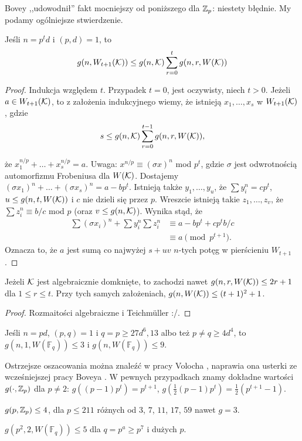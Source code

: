 Bovey ,,udowodnił'' fakt mocniejszy od poniższego dla $\mathbb Z_p$: niestety błędnie.
My podamy ogólniejsze stwierdzenie.

\begin{lemat}
	Jeśli $n = p^td$ i $(p, d) = 1$, to 
	\[
		g(n, W_{t+1}(\mathcal K)) \le g(n, \mathcal K) \sum_{r = 0}^t g(n, r, W(\mathcal K))
	\]
\end{lemat}

\begin{proof}
	Indukcja względem $t$.
	Przypadek $t = 0$, jest oczywisty, niech $t > 0$.
	Jeżeli $a \in W_{t+1}(\mathcal K)$, to z założenia indukcyjnego wiemy, że istnieją $x_1, \ldots, x_s$ w $W_{t+1}(\mathcal K)$, gdzie
	\[
		s \le g(n, \mathcal K) \sum_{r = 0}^{t-1} g(n, r, W(\mathcal K)),
	\]

	że $x_1^{n/p} + \ldots + x_s^{n/p} = a$.
	Uwaga: $x^{n/p} \equiv (\sigma x)^n$ mod $p^t$, gdzie $\sigma$ jest odwrotnością automorfizmu Frobeniusa dla $W(\mathcal K)$.
	Dostajemy $(\sigma x_1)^n + \ldots + (\sigma x_s)^n = a - bp^t$.
	Istnieją także $y_1, \ldots, y_u$, że $\sum y_i^n = cp^t$, $u \le g(n, t, W(\mathcal K))$ i $c$ nie dzieli się przez $p$.
	Wreszcie istnieją takie $z_1, \ldots, z_v$, że $\sum z_i^n \equiv b/c$ mod $p$ (oraz $v \le g(n,\mathcal K)$).
	Wynika stąd, że
	\begin{align*}
		\sum (\sigma x_i)^n + \sum y_i^n \sum z_i^n & \equiv a - bp^t + cp^t b/c \\
		& \equiv a \pmod {p^{t+1}}.
	\end{align*}
	Oznacza to, że $a$ jest sumą co najwyżej $s+ uv$ $n$-tych potęg w pierścieniu $W_{t+1}$.
\end{proof}

\begin{wniosek}
	Jeżeli $\mathcal K$ jest algebraicznie domknięte, to zachodzi nawet $g(n, r, W(\mathcal K)) \le 2r+1$ dla $1 \le r \le t$.
	Przy tych samych założeniach, $g(n, W(\mathcal K)) \le (t+1)^2 + 1$.
\end{wniosek}

\begin{proof}
	Rozmaitości algebraiczne i Teichmüller :/.
\end{proof}

\begin{fakt}
	Jeśli $n = pd$, $(p,q) = 1$ i $q = p \ge 27d^6, 13$ albo też $p \neq q \ge 4d^4$, to $g(n, 1, W(\mathbb F_q)) \le 3$ i $g(n, W(\mathbb F_q)) \le 9$.
\end{fakt}

Ostrzejsze oszacowania można znaleźć w pracy Volocha \cite{voloch99}, naprawia ona usterki ze wcześniejszej pracy Boveya \cite{bovey76}.
W pewnych przypadkach znamy dokładne wartości $g(\cdot, \mathbb Z_p)$ dla $p \neq 2$: $g((p-1)p^t) = p^{t+1}$, $g(\frac 1 2 (p-1)p^t) = \frac 1 2 (p^{t+1} - 1)$.

\begin{fakt}
	$g(p, \mathbb Z_p) \le 4$, dla $p \le 211$ różnych od $3$, $7$, $11$, $17$, $59$ nawet $g = 3$.
\end{fakt}

\begin{fakt}
	$g(p^2, 2, W(\mathbb F_q)) \le 5$ dla $q = p^a \ge p^7$ i dużych $p$.
\end{fakt}

